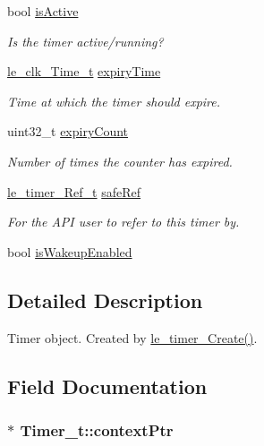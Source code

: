 \begin{DoxyCompactItemize}
bool \hyperlink{struct_timer__t_ab30c837ffb98b2b38063d7a87da314d1}{is\+Active}
\begin{DoxyCompactList}\small\item\em Is the timer active/running? \end{DoxyCompactList}\item 
\hyperlink{structle__clk___time__t}{le\+\_\+clk\+\_\+\+Time\+\_\+t} \hyperlink{struct_timer__t_a69c227080ba546fd26bceef8977ec050}{expiry\+Time}
\begin{DoxyCompactList}\small\item\em Time at which the timer should expire. \end{DoxyCompactList}\item 
uint32\+\_\+t \hyperlink{struct_timer__t_abf372745a814acf0aaa7ad066617daac}{expiry\+Count}
\begin{DoxyCompactList}\small\item\em Number of times the counter has expired. \end{DoxyCompactList}\item 
\hyperlink{le__timer_8h_a763fa6992488cdce3b5a820817094838}{le\+\_\+timer\+\_\+\+Ref\+\_\+t} \hyperlink{struct_timer__t_afe5762bc74307321b2575859dafc9135}{safe\+Ref}
\begin{DoxyCompactList}\small\item\em For the A\+PI user to refer to this timer by. \end{DoxyCompactList}\item 
bool \hyperlink{struct_timer__t_a8c5f8bfe26e9a594a0fb272f522af293}{is\+Wakeup\+Enabled}
\end{DoxyCompactItemize}


\subsection{Detailed Description}
Timer object. Created by \hyperlink{le__timer_8h_aee41169a210378b369f440cf99146522}{le\+\_\+timer\+\_\+\+Create()}. 

\subsection{Field Documentation}
\subsubsection[{\texorpdfstring{context\+Ptr}{contextPtr}}]{$\ast$ Timer\+\_\+t\+::context\+Ptr}\hypertarget{struct_timer__t_ac86f7b42e9ab20824f12d9fedbbba135}{}\label{struct_timer__t_ac86f7b42e9ab20824f12d9fedbbba135}


